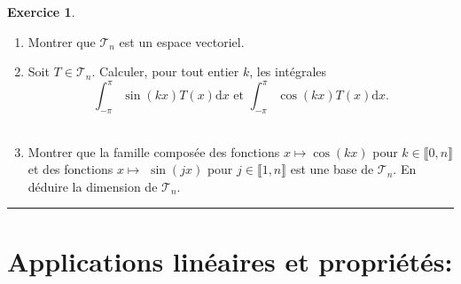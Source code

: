 \documentclass[a4paper,11pt]{article}
\theoremstyle{definition}
\newtheorem{exo}{Exercice} %
\begin{document}
\begin{minipage}{1\linewidth}
\begin{minipage}[t]{0.48\linewidth}
\begin{exo}
		
		\begin{enumerate}
		\item Montrer que $\mathscr{T}_{n}$ est un espace vectoriel.
		\item Soit $T \in \mathscr{T}_{n}$. Calculer, pour tout entier $k$, les intégrales
		\quad\\[-0.6cm]
		$$
		\int_{-\pi}^{\pi} \sin (k x) T(x) \mathrm{d} x \text { et } \int_{-\pi}^{\pi} \cos (k x) T(x) \mathrm{d} x .
		$$ \quad\\[-0.6cm]
		\item Montrer que la famille composée des fonctions $x \mapsto \cos (k x)$ pour $k \in \llbracket 0, n \rrbracket$ et des fonctions $x \mapsto$ $\sin (j x)$ pour $j \in \llbracket 1, n \rrbracket$ est une base de $\mathscr{T}_{n}$. En déduire la dimension de $\mathscr{T}_{n}$.
		
		\end{enumerate}
			
			\centering\rule{1\linewidth}{0.6pt}\end{exo}
		
		
		
		
\end{minipage}\end{minipage} 

\section*{Applications linéaires et propriétés:}\hfill\\%
\end{document}

